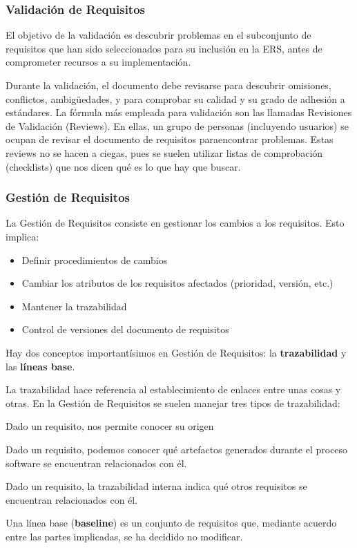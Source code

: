 \subsubsection{Validación de Requisitos}
\label{sec:requisitos:validacion}

El objetivo de la validación es descubrir problemas en el subconjunto
de requisitos que han sido seleccionados para su inclusión en la ERS,
antes de comprometer recursos a su implementación.

Durante la validación, el documento debe revisarse para descubrir
omisiones, conflictos, ambigüedades, y para comprobar su calidad y su
grado de adhesión a estándares. La fórmula más empleada para
validación son las llamadas Revisiones de Validación (Reviews). En
ellas, un grupo de personas (incluyendo usuarios) se ocupan de revisar
el documento de requisitos paraencontrar problemas. Estas reviews no
se hacen a ciegas, pues se suelen utilizar listas de comprobación
(checklists) que nos dicen qué es lo que hay que buscar.

\subsubsection{Gestión de Requisitos}
\label{sec:requisitos:gestion}

La Gestión de Requisitos consiste en gestionar los cambios a los
requisitos. Esto implica:

\begin{itemize}[noitemsep]
\item Definir procedimientos de cambios
\item Cambiar los atributos de los requisitos afectados (prioridad, versión, etc.)
\item Mantener la trazabilidad
\item Control de versiones del documento de requisitos
\end{itemize}

Hay dos conceptos importantísimos en Gestión de Requisitos: la \textbf{trazabilidad} y las \textbf{líneas base}.

La trazabilidad hace referencia al establecimiento de enlaces entre
unas cosas y otras. En la Gestión de Requisitos se suelen manejar tres
tipos de trazabilidad:

\begin{description}[noitemsep]
\item [Trazabilidad hacia atrás] Dado un requisito, nos permite conocer
  su origen
\item [Trazabilidad hacia delante] Dado un requisito, podemos conocer
  qué artefactos generados durante el proceso software se encuentran
  relacionados con él.
\item [Trazabilidad interna] Dado un requisito, la trazabilidad interna
  indica qué otros requisitos se encuentran relacionados con él.
\end{description}

Una línea base (\textbf{baseline}) es un conjunto de requisitos que, mediante acuerdo entre las partes
implicadas, se ha decidido no modificar.
